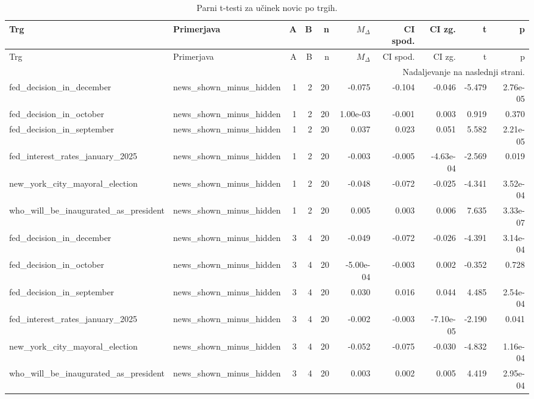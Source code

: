 \scriptsize
\setlength{\LTleft}{0pt}
\setlength{\LTright}{0pt}
\begin{longtable}{llrrrrrrrr}
\caption{Parni t-testi za učinek novic po trgih.}\label{tab:ttests-news}\\
\toprule
Trg & Primerjava & A & B & n & $M_\Delta$ & CI spod. & CI zg. & t & p \\
\midrule
\endfirsthead
\toprule
Trg & Primerjava & A & B & n & $M_\Delta$ & CI spod. & CI zg. & t & p \\
\midrule
\endhead
\midrule
\multicolumn{10}{r}{Nadaljevanje na naslednji strani.} \\
\endfoot
\bottomrule
\endlastfoot
fed\_decision\_in\_december & news\_shown\_minus\_hidden & 1 & 2 & 20 & -0.075 & -0.104 & -0.046 & -5.479 & 2.76e-05 \\
fed\_decision\_in\_october & news\_shown\_minus\_hidden & 1 & 2 & 20 & 1.00e-03 & -0.001 & 0.003 & 0.919 & 0.370 \\
fed\_decision\_in\_september & news\_shown\_minus\_hidden & 1 & 2 & 20 & 0.037 & 0.023 & 0.051 & 5.582 & 2.21e-05 \\
fed\_interest\_rates\_january\_2025 & news\_shown\_minus\_hidden & 1 & 2 & 20 & -0.003 & -0.005 & -4.63e-04 & -2.569 & 0.019 \\
new\_york\_city\_mayoral\_election & news\_shown\_minus\_hidden & 1 & 2 & 20 & -0.048 & -0.072 & -0.025 & -4.341 & 3.52e-04 \\
who\_will\_be\_inaugurated\_as\_president & news\_shown\_minus\_hidden & 1 & 2 & 20 & 0.005 & 0.003 & 0.006 & 7.635 & 3.33e-07 \\
fed\_decision\_in\_december & news\_shown\_minus\_hidden & 3 & 4 & 20 & -0.049 & -0.072 & -0.026 & -4.391 & 3.14e-04 \\
fed\_decision\_in\_october & news\_shown\_minus\_hidden & 3 & 4 & 20 & -5.00e-04 & -0.003 & 0.002 & -0.352 & 0.728 \\
fed\_decision\_in\_september & news\_shown\_minus\_hidden & 3 & 4 & 20 & 0.030 & 0.016 & 0.044 & 4.485 & 2.54e-04 \\
fed\_interest\_rates\_january\_2025 & news\_shown\_minus\_hidden & 3 & 4 & 20 & -0.002 & -0.003 & -7.10e-05 & -2.190 & 0.041 \\
new\_york\_city\_mayoral\_election & news\_shown\_minus\_hidden & 3 & 4 & 20 & -0.052 & -0.075 & -0.030 & -4.832 & 1.16e-04 \\
who\_will\_be\_inaugurated\_as\_president & news\_shown\_minus\_hidden & 3 & 4 & 20 & 0.003 & 0.002 & 0.005 & 4.419 & 2.95e-04 \\

\end{longtable}

